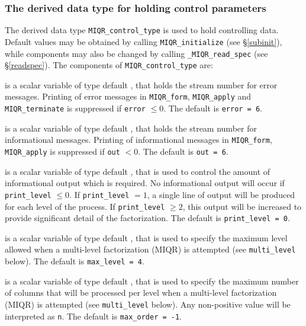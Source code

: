 \documentclass{galahad}
\newcommand{\packagename}{MIQR}
\newcommand{\fullpackagename}{\libraryname\_\packagename}
\begin{document}

\subsubsection{The derived data type for holding control 
 parameters}\label{typecontrol}
The derived data type 
{\tt \packagename\_control\_type} 
is used to hold controlling data. Default values may be obtained by calling 
{\tt \packagename\_initialize}
(see \S\ref{subinit}),
while components may also be changed by calling 
{\tt \fullpackagename\_read\-\_spec}
(see \S\ref{readspec}). 
The components of 
{\tt \packagename\_control\_type} 
are:

\begin{description}

 is a scalar variable of type default \integer, that holds the
stream number for error messages. Printing of error messages in 
{\tt \packagename\_form}, {\tt \packagename\_apply} 
and {\tt \packagename\_terminate} 
is suppressed if {\tt error} $\leq 0$.
The default is {\tt error = 6}.

 is a scalar variable of type default \integer, that holds the
stream number for informational messages. Printing of informational messages in 
{\tt \packagename\_form}, {\tt \packagename\_apply} 
is suppressed if {\tt out} $< 0$.
The default is {\tt out = 6}.

 is a scalar variable of type default \integer, that is used
to control the amount of informational output which is required. No 
informational output will occur if {\tt print\_level} $\leq 0$. If 
{\tt print\_level} $= 1$, a single line of output will be produced for each
level of the process. If {\tt print\_level} $\geq 2$, this output will be
increased to provide significant detail of the factorization.
The default is {\tt print\_level = 0}.

 is a scalar variable of type default \integer, that is used
to specify the maximum level allowed when a multi-level factorization (MIQR)
is attempted (see {\tt multi\_level} below).
The default is {\tt max\_level = 4}.

 is a scalar variable of type default \integer, that is used
to specify the maximum number of columns that will be processed per level 
when a multi-level factorization (MIQR) is attempted 
(see {\tt multi\_level} below).
Any non-positive value will be interpreted as {\tt n}.
The default is {\tt max\_order = -1}.


\end{description}
\end{document}
